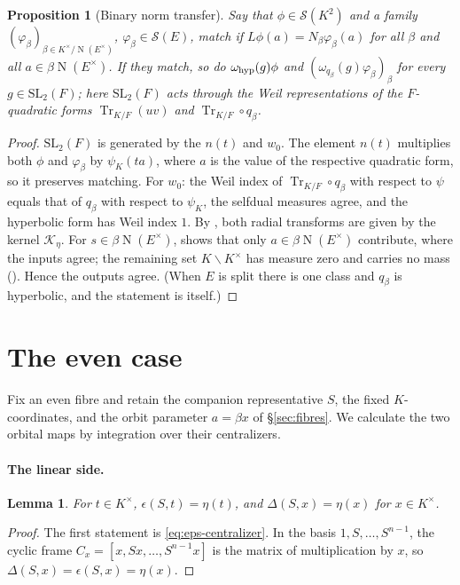 \documentclass[11pt,oneside,notitlepage]{book}
\numberwithin{equation}{section}
\theoremstyle{plain}
\newtheorem{proposition}[theorem]{Proposition}
\newtheorem{lemma}[theorem]{Lemma}
\theoremstyle{definition}
\newcommand{\SL}{\mathrm{SL}}
\newcommand{\cS}{\mathcal{S}}
\newcommand{\Tr}{\operatorname{Tr}}
\newcommand{\N}{\operatorname{N}}
\begin{document}
\begin{proposition}[Binary norm transfer]\label{prop:binary}
Say that $\phi\in\cS(K^2)$ and a family $(\varphi_\beta)_{\beta\in K^\times/\N(E^\times)}$, $\varphi_\beta\in\cS(E)$, match if $L\phi(a)=N_\beta\varphi_\beta(a)$ for all $\beta$ and all $a\in\beta\N(E^\times)$. If they match, so do $\omega_{\rm hyp}(g)\phi$ and $(\omega_{q_\beta}(g)\varphi_\beta)_\beta$ for every $g\in\SL_2(F)$; here $\SL_2(F)$ acts through the Weil representations of the $F$-quadratic forms $\Tr_{K/F}(uv)$ and $\Tr_{K/F}\circ q_\beta$.
\end{proposition}
\begin{proof}
$\SL_2(F)$ is generated by the $n(t)$ and $w_0$. The element $n(t)$ multiplies both $\phi$ and $\varphi_\beta$ by $\psi_K(ta)$, where $a$ is the value of the respective quadratic form, so it preserves matching. For $w_0$: the Weil index of $\Tr_{K/F}\circ q_\beta$ with respect to $\psi$ equals that of $q_\beta$ with respect to $\psi_K$, the selfdual measures agree, and the hyperbolic form has Weil index $1$. By , both radial transforms are given by the kernel $\mathcal K_\eta$. For $s\in\beta\N(E^\times)$,  shows that only $a\in\beta\N(E^\times)$ contribute, where the inputs agree; the remaining set $K\smallsetminus K^\times$ has measure zero and carries no mass (). Hence the outputs agree. (When $E$ is split there is one class and $q_\beta$ is hyperbolic, and the statement is  itself.)
\end{proof}

\section{The even case}\label{sec:even}

Fix an even fibre and retain the companion representative $S$, the fixed $K$-coordinates, and the orbit parameter $a=\beta x$ of \S\ref{sec:fibres}. We calculate the two orbital maps by integration over their centralizers.

\paragraph{The linear side.}
\begin{lemma}\label{lem:even-gauge}
For $t\in K^\times$, $\epsilon(S,t)=\eta(t)$, and $\Delta(S,x)=\eta(x)$ for $x\in K^\times$.
\end{lemma}
\begin{proof}
The first statement is \eqref{eq:eps-centralizer}. In the basis $1,S,\dots,S^{n-1}$, the cyclic frame $C_x=[x,Sx,\dots,S^{n-1}x]$ is the matrix of multiplication by $x$, so $\Delta(S,x)=\epsilon(S,x)=\eta(x)$.
\end{proof}
\end{document}
